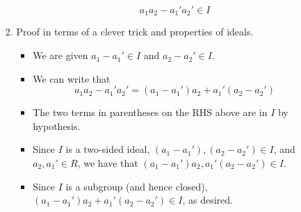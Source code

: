 \documentclass[../notes.tex]{subfiles}
\begin{document}
\begin{itemize}
\begin{itemize}
\begin{enumerate}
\begin{itemize}
\begin{equation*}
                    a_1a_2-a_1'a_2' \in I
                \end{equation*}
            \end{itemize}
            \item Proof in terms of a clever trick and properties of ideals.
            \begin{itemize}
                \item We are given $a_1-a_1'\in I$ and $a_2-a_2'\in I$.
                \item We can write that
                \begin{equation*}
                    a_1a_2-a_1'a_2' = (a_1-a_1')a_2+a_1'(a_2-a_2')
                \end{equation*}
                \item The two terms in parentheses on the RHS above are in $I$ by hypothesis.
                \item Since $I$ is a two-sided ideal, $(a_1-a_1'),(a_2-a_2')\in I$, and $a_2,a_1'\in R$, we have that $(a_1-a_1')a_2,a_1'(a_2-a_2')\in I$.
                \item Since $I$ is a subgroup (and hence closed), $(a_1-a_1')a_2+a_1'(a_2-a_2')\in I$, as desired.
            \end{itemize}
        \end{enumerate}
    \end{itemize}
\end{itemize}
\end{document}
